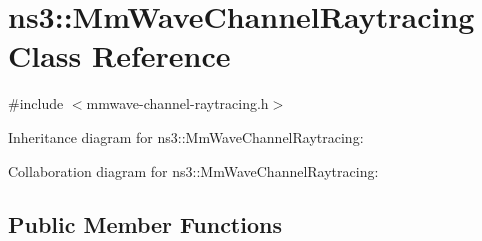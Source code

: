 \hypertarget{classns3_1_1MmWaveChannelRaytracing}{}\section{ns3\+:\+:Mm\+Wave\+Channel\+Raytracing Class Reference}
\label{classns3_1_1MmWaveChannelRaytracing}


{\ttfamily \#include $<$mmwave-\/channel-\/raytracing.\+h$>$}



Inheritance diagram for ns3\+:\+:Mm\+Wave\+Channel\+Raytracing\+:


Collaboration diagram for ns3\+:\+:Mm\+Wave\+Channel\+Raytracing\+:
\subsection*{Public Member Functions}
